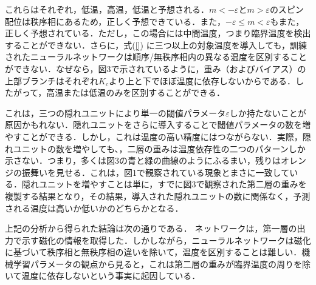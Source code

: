 \documentclass[a4paper,11pt]{jsarticle}
\begin{document}
これらはそれぞれ，低温，高温，低温と予想される．$m<-\varepsilon$と$m>\varepsilon$のスピン配位は秩序相にあるため，正しく予想できている．また，$-\varepsilon \leq m < \varepsilon$もまた，正しく予想されている．ただし，この場合には中間温度，つまり臨界温度を検出することができない．さらに，式(\ref{}) に三つ以上の対象温度を導入しても，訓練されたニューラルネットワークは順序/無秩序相内の異なる温度を区別することができない．なぜなら，図3で示されているように，重み（およびバイアス）の上部ブランチはそれぞれ$K_c$より上と下でほぼ温度に依存しないからである．したがって，高温または低温のみを区別することができる．\par
これは，三つの隠れユニットにより単一の閾値パラメータ$\varepsilon$しか持たないことが原因かもれない．隠れユニットをさらに導入することで閾値パラメータの数を増やすことができる．しかし，これは温度の高い精度にはつながらない．実際，隠れユニットの数を増やしても、，二層の重みは温度依存性の二つのパターンしか示さない．つまり，多くは図3の青と緑の曲線のようにふるまい，残りはオレンジの振舞いを見せる．これは，図1で観察されている現象とまさに一致している．隠れユニットを増やすことは単に，すでに図3で観察された第二層の重みを複製する結果となり，その結果，導入された隠れユニットの数に関係なく，予測される温度は高いか低いかのどちらかとなる．\par
上記の分析から得られた結論は次の通りである．
ネットワークは，第一層の出力で示す磁化の情報を取得した．しかしながら，ニューラルネットワークは磁化に基づいて秩序相と無秩序相の違いを除いて，温度を区別することは難しい．機械学習パラメータの観点から見ると，これは第二層の重みが臨界温度の周りを除いて温度に依存しないという事実に起因している．
\end{document}
